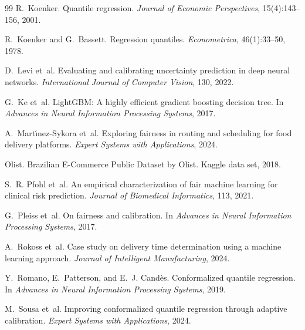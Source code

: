 \documentclass[10pt,twocolumn]{article}
\begin{document}
\begin{thebibliography}{99}
R.~Koenker.
\newblock Quantile regression.
\newblock \emph{Journal of Economic Perspectives}, 15(4):143--156, 2001.

R.~Koenker and G.~Bassett.
\newblock Regression quantiles.
\newblock \emph{Econometrica}, 46(1):33--50, 1978.

D.~Levi et~al.
\newblock Evaluating and calibrating uncertainty prediction in deep neural networks.
\newblock \emph{International Journal of Computer Vision}, 130, 2022.

G.~Ke et~al.
\newblock LightGBM: A highly efficient gradient boosting decision tree.
\newblock In \emph{Advances in Neural Information Processing Systems}, 2017.

A.~Mart{\'\i}nez-Sykora et~al.
\newblock Exploring fairness in routing and scheduling for food delivery platforms.
\newblock \emph{Expert Systems with Applications}, 2024.

Olist.
\newblock Brazilian E-Commerce Public Dataset by Olist.
\newblock Kaggle data set, 2018.

S.~R. Pfohl et~al.
\newblock An empirical characterization of fair machine learning for clinical risk prediction.
\newblock \emph{Journal of Biomedical Informatics}, 113, 2021.

G.~Pleiss et~al.
\newblock On fairness and calibration.
\newblock In \emph{Advances in Neural Information Processing Systems}, 2017.

A.~Rokoss et~al.
\newblock Case study on delivery time determination using a machine learning approach.
\newblock \emph{Journal of Intelligent Manufacturing}, 2024.

Y.~Romano, E.~Patterson, and E.~J. Cand{\`e}s.
\newblock Conformalized quantile regression.
\newblock In \emph{Advances in Neural Information Processing Systems}, 2019.

M.~Sousa et~al.
\newblock Improving conformalized quantile regression through adaptive calibration.
\newblock \emph{Expert Systems with Applications}, 2024.


\end{thebibliography}
\end{document}

